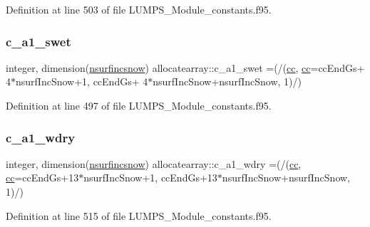 Definition at line 503 of file L\+U\+M\+P\+S\+\_\+\+Module\+\_\+constants.\+f95.

\mbox{\label{namespaceallocatearray_a2af0ac8edfec0bc48cfe96430b85f9af}} 
\subsubsection{\texorpdfstring{c\+\_\+a1\+\_\+swet}{c\_a1\_swet}}
{\footnotesize\ttfamily integer, dimension(\hyperlink{namespaceallocatearray_af4d113f332b6759cfa22271140c9162d}{nsurfincsnow}) allocatearray\+::c\+\_\+a1\+\_\+swet =(/(\hyperlink{namespaceallocatearray_ac863c81704eb507dee10f5e10741e10c}{cc}, \hyperlink{namespaceallocatearray_ac863c81704eb507dee10f5e10741e10c}{cc}=cc\+End\+Gs+ 4$\ast$nsurf\+Inc\+Snow+1, cc\+End\+Gs+ 4$\ast$nsurf\+Inc\+Snow+nsurf\+Inc\+Snow, 1)/)}



Definition at line 497 of file L\+U\+M\+P\+S\+\_\+\+Module\+\_\+constants.\+f95.

\mbox{\label{namespaceallocatearray_ae30c247162a61d3f6feb20ef75f9c046}} 
\subsubsection{\texorpdfstring{c\+\_\+a1\+\_\+wdry}{c\_a1\_wdry}}
{\footnotesize\ttfamily integer, dimension(\hyperlink{namespaceallocatearray_af4d113f332b6759cfa22271140c9162d}{nsurfincsnow}) allocatearray\+::c\+\_\+a1\+\_\+wdry =(/(\hyperlink{namespaceallocatearray_ac863c81704eb507dee10f5e10741e10c}{cc}, \hyperlink{namespaceallocatearray_ac863c81704eb507dee10f5e10741e10c}{cc}=cc\+End\+Gs+13$\ast$nsurf\+Inc\+Snow+1, cc\+End\+Gs+13$\ast$nsurf\+Inc\+Snow+nsurf\+Inc\+Snow, 1)/)}



Definition at line 515 of file L\+U\+M\+P\+S\+\_\+\+Module\+\_\+constants.\+f95.

\mbox{\label{namespaceallocatearray_a259bdea5ff3b256a8d42eed33dd787f6}} 

